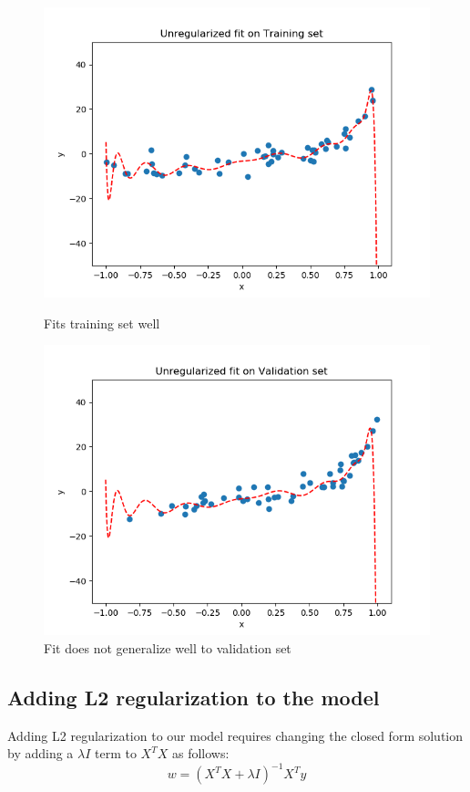 \documentclass[paper=a4, fontsize=11pt]{scrartcl} %
\numberwithin{equation}{section} %
\numberwithin{figure}{section} %
\numberwithin{table}{section} %
\begin{document}
\begin{figure}[H]
    \includegraphics[width=\linewidth]{q1p12.png}
    \caption{Fits training set well}
    \label{fig:q1p12}
    \vspace{0.5cm}
    \includegraphics[width=\linewidth]{q1p13.png}
    \caption{Fit does not generalize well to validation set}
    \label{fig:q1p13}
\end{figure}

\subsection{Adding L2 regularization to the model}
Adding L2 regularization to our model requires changing the closed form solution by adding a \( \lambda I \) term to \(X^TX\) as follows:
\[ w = (X^TX + \lambda I)^{-1}X^Ty \]
\end{document}
